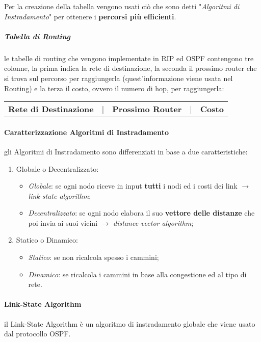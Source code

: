\documentclass[a4paper]{article}
\begin{document}
			Per la creazione della tabella vengono usati ciò che sono detti "\emph{Algoritmi di Instradamento}" per ottenere i \textbf{percorsi più efficienti}. 
			
				\subparagraph{Tabella di Routing}
					le tabelle di routing che vengono implementate in RIP ed OSPF contengono tre colonne, la prima indica la rete di destinazione, la seconda il prossimo router che si trova sul percorso per raggiungerla (quest'informazione viene usata nel Routing) e la terza il costo, ovvero il numero di hop, per raggiungerla:
					\begin{center}
						\begin{tabular}{ccccc}
						\textbf{Rete di Destinazione} & | & \textbf{Prossimo Router} & | & \textbf{Costo} \\
						\end{tabular}
					\end{center}
			
			\paragraph{Caratterizzazione Algoritmi di Instradamento}
				gli Algoritmi di Instradamento sono differenziati in base a due caratteristiche:
				\begin{enumerate}
					\item Globale o Decentralizzato:
						\begin{itemize}
							\item \emph{Globale}: se ogni nodo riceve in input \textbf{tutti} i nodi ed i costi dei link $ \rightarrow $ \emph{link-state algorithm};
							\item \emph{Decentralizzato}: se ogni nodo elabora il suo \textbf{vettore delle distanze} che poi invia ai suoi vicini $ \rightarrow $ \emph{distance-vector algorithm};
						\end{itemize}
					\item Statico o Dinamico:
						\begin{itemize}
							\item \emph{Statico}: se non ricalcola spesso i cammini;
							\item \emph{Dinamico}: se ricalcola i cammini in base alla congestione ed al tipo di rete.
						\end{itemize}
				\end{enumerate}
				
			\paragraph{Link-State Algorithm}
				il Link-State Algorithm è un algoritmo di instradamento globale che viene usato dal protocollo OSPF.
				
\end{document}
